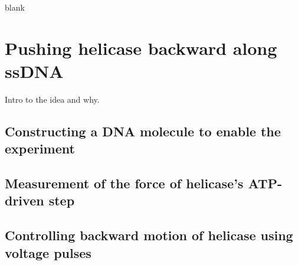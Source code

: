 \begin{savequote}[75mm]
blank
\end{savequote}

\chapter{Pushing helicase backward along ssDNA}
\label{helicase_backward_motion}

Intro to the idea and why.

\section{Constructing a DNA molecule to enable the experiment}

\section{Measurement of the force of helicase's ATP-driven step}

\section{Controlling backward motion of helicase using voltage pulses}
